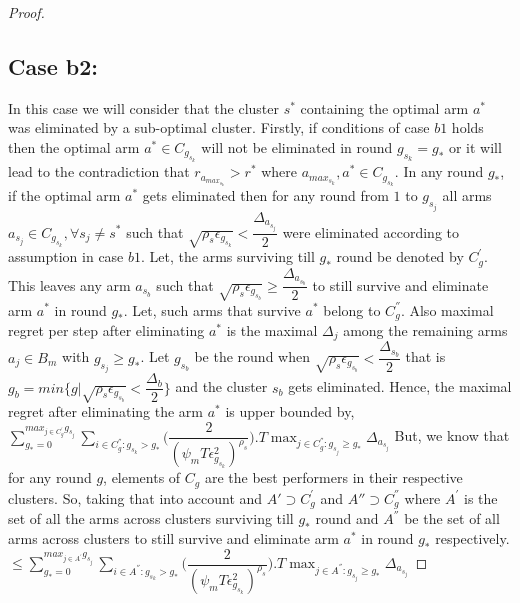 \begin{proof}
\subsection{Case b2:} 
In this case we will consider that the cluster $s^{*}$ containing the optimal arm $a^{*}$ was eliminated by a sub-optimal cluster. Firstly, if conditions of case $b1$ holds then the optimal arm $a^{*}\in C_{g_{s_{k}}}$ will not be eliminated in round $g_{s_{k}}=g_{*}$ or it will lead to the contradiction that $r_{a_{max_{s_{k}}}}>r^{*}$ where $a_{max_{s_{k}}},a^{*}\in C_{g_{s_{k}}}$. In any round $g_{*}$, if the optimal arm $a^{*}$ gets eliminated then for any round from $1$ to $g_{s_{j}}$ all arms $a_{s_{j}}\in C_{g_{s_{k}}},\forall s_{j}\neq s^{*}$ such that $\sqrt{\rho_{s}\epsilon_{g_{s_{k}}}}<\dfrac{\Delta_{a_{s_{j}}}}{2}$ were eliminated according to assumption in case $b1$. Let, the arms surviving till $g_{*}$ round be denoted by $C_{g}^{'}$. This leaves any arm $a_{s_{b}}$ such that $\sqrt{\rho_{s}\epsilon_{g_{s_{b}}}}\geq\dfrac{\Delta_{a_{s_{b}}}}{2}$ to still survive and eliminate arm $a^{*}$ in round $g_{*}$. Let, such arms that survive $a^{*}$ belong to $C_{g}^{''}$. Also maximal regret per step after eliminating $a^{*}$ is the maximal $\Delta_{j}$ among the remaining arms $a_{j}\in B_{m}$ with $g_{s_{j}}\geq g_{*}$.  Let $g_{s_{b}}$ be the round when $\sqrt{\rho_{s}\epsilon_{g_{s_{b}}}}<\dfrac{\Delta_{s_{b}}}{2}$ that is $g_{b}=min\lbrace g|\sqrt{\rho_{s}\epsilon_{g_{s_{b}}}}<\dfrac{\Delta_{b}}{2}\rbrace$ and the cluster $s_{b}$ gets eliminated. Hence, the maximal regret after eliminating the arm $a^{*}$ is upper bounded by, 
\newline
$\sum_{g_{*}=0}^{max_{j\in C_{g}^{'}}g_{s_{j}}}\sum_{i\in C_{g}^{''}:g_{s_{k}}>g_{*}}\bigg(\dfrac{2}{(\psi_{m}T\epsilon_{g_{s_{k}}}^{2})^{\rho_{s}}} \bigg).T\max_{j\in C_{g}^{''}:g_{s_{j}}\geq g_{*}}{\Delta}_{a_{s_{j}}}$
\newline
But, we know that for any round $g$, elements of $C_{g}$ are the best performers in their respective clusters. So, taking that into account and $A'\supset C_{g}^{'}$ and $A''\supset C_{g}^{''}$ where $A^{'}$ is the set of all the arms across clusters surviving till $g_{*}$ round and $A^{''}$ be the set of all arms across clusters to still survive and eliminate arm $a^{*}$ in round $g_{*}$ respectively. 
\newline
$\leq\sum_{g_{*}=0}^{max_{j\in A^{'}}g_{s_{j}}}\sum_{i\in A^{''}:g_{s_{k}}>g_{*}}\bigg(\dfrac{2}{(\psi_{m}T\epsilon_{g_{s_{k}}}^{2})^{\rho_{s}}} \bigg).T\max_{j\in A^{''}:g_{s_{j}}\geq g_{*}}{\Delta}_{a_{s_{j}}}$

\end{proof}
